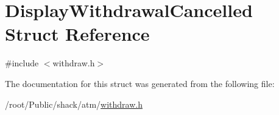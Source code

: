\hypertarget{structDisplayWithdrawalCancelled}{\section{Display\-Withdrawal\-Cancelled Struct Reference}
\label{structDisplayWithdrawalCancelled}
}


{\ttfamily \#include $<$withdraw.\-h$>$}



The documentation for this struct was generated from the following file\-:\begin{DoxyCompactItemize}
\item 
/root/\-Public/shack/atm/\hyperlink{withdraw_8h}{withdraw.\-h}\end{DoxyCompactItemize}
